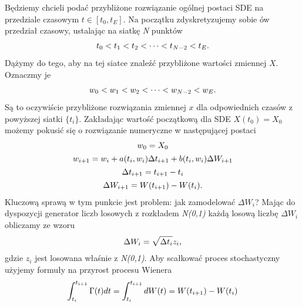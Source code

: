 \documentclass[a4paper,12pt,polish]{sphinxmanual}
\begin{document}
Będziemy chcieli podać przybliżone rozwiązanie ogólnej postaci SDE na przedziale czasowym
$t \in [t_0,t_E]$. Na początku zdyskretyzujemy sobie ów przedział czasowy, ustalając na siatkę
\emph{N} punktów
\begin{gather}
\begin{split}t_0 < t_1 < t_2 < \dots < t_{N-2} < t_E.\end{split}\notag
\end{gather}
Dążymy do tego, aby na tej siatce znaleźć przybliżone wartości zmiennej $X$. Oznaczmy je
\begin{gather}
\begin{split}w_0 < w_1 < w_2< \dots < w_{N-2} < w_E.\end{split}\notag
\end{gather}
Są to oczywiście przybliżone rozwiązania zmiennej $x$ dla odpowiednich czasów z powyższej siatki
$\{t_i\}$. Zakładając wartość początkową dla SDE $X(t_0) = X_0$ możemy pokusić się
o rozwiązanie numeryczne w następującej postaci
\begin{gather}
\begin{split}w_0 = X_0\end{split}\notag\\\begin{split}w_{i+1} = w_i + a (t_i, w_i) \Delta t_{i+1} + b(t_i, w_i) \Delta W_{i+1}\end{split}\notag\\\begin{split}\Delta t_{i+1} = t_{i+1} - t_i\end{split}\notag\\\begin{split}\Delta W_{i+1} = W(t_{i+1}) - W(t_i).\end{split}\notag
\end{gather}
Kluczową sprawą w tym punkcie jest problem: jak zamodelować $\Delta W_i$? Mając do dyspozycji generator
liczb losowych z rozkładem \emph{N(0,1)} każdą losową liczbę $\Delta W_i$ obliczamy ze wzoru
\begin{gather}
\begin{split}\Delta W_i = \sqrt{\Delta t_i} z_i,\end{split}\notag
\end{gather}
gdzie $z_i$ jest losowana właśnie z \emph{N(0,1)}.
Aby scałkować proces stochastyczny użyjemy formuły na przyrost procesu Wienera
\begin{gather}
\begin{split}\int_{t_i}^{t_{i+1}} \Gamma(t) dt =
\int_{t_i}^{t_{i+1}} dW(t) =  W(t_{i+1}) - W(t_i)\end{split}\notag
\end{gather}
\end{document}
